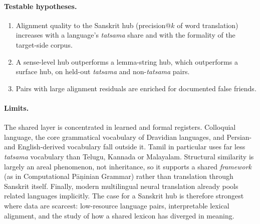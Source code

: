 \paragraph{Testable hypotheses.}
\begin{enumerate}
\item Alignment quality to the Sanskrit hub (precision@$k$ of word
  translation) increases with a language's \emph{tatsama} share and with the
  formality of the target-side corpus.
\item A sense-level hub outperforms a lemma-string hub, which outperforms a
  surface hub, on held-out \emph{tatsama} and non-\emph{tatsama} pairs.
\item Pairs with large alignment residuals are enriched for documented false
  friends.
\end{enumerate}

\paragraph{Limits.} The shared layer is concentrated in learned and formal
registers. Colloquial language, the core grammatical vocabulary of Dravidian
languages, and Persian- and English-derived vocabulary fall outside it.
Tamil in particular uses far less \emph{tatsama} vocabulary than Telugu,
Kannada or Malayalam. Structural similarity is largely an areal phenomenon,
not inheritance, so it supports a shared \emph{framework} (as in
Computational Pāṇinian Grammar) rather than translation through Sanskrit
itself. Finally, modern multilingual neural translation already pools
related languages implicitly. The case for a Sanskrit hub is therefore
strongest where data are scarcest: low-resource language pairs,
interpretable lexical alignment, and the study of how a shared lexicon has
diverged in meaning.

